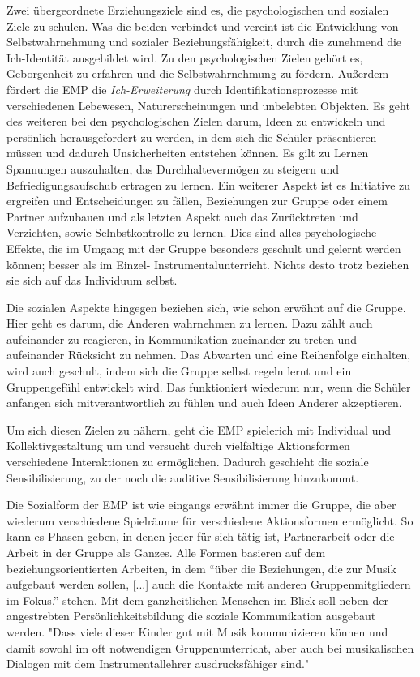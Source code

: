 Zwei übergeordnete Erziehungsziele sind es, die psychologischen und sozialen
Ziele zu schulen. Was die beiden verbindet und vereint ist die Entwicklung
von Selbstwahrnehmung und sozialer Beziehungsfähigkeit, durch die zunehmend die
Ich-Identität ausgebildet wird. Zu den psychologischen Zielen gehört es,
Geborgenheit zu erfahren und die Selbstwahrnehmung zu fördern. Außerdem fördert
die EMP die \emph{Ich-Erweiterung} durch Identifikationsprozesse mit verschiedenen
Lebewesen, Naturerscheinungen und unbelebten Objekten. Es geht des weiteren bei
den psychologischen Zielen darum, Ideen zu entwickeln und persönlich
herausgefordert zu werden, in dem sich die Schüler präsentieren müssen und
dadurch Unsicherheiten entstehen können. Es gilt zu Lernen Spannungen
auszuhalten, das Durchhaltevermögen zu steigern und Befriedigungsaufschub
ertragen zu lernen. Ein weiterer Aspekt ist es Initiative zu ergreifen und
Entscheidungen zu fällen, Beziehungen zur Gruppe oder einem Partner aufzubauen
und als letzten Aspekt auch das Zurücktreten und Verzichten, sowie
Selnbstkontrolle zu lernen. Dies sind alles psychologische Effekte, die im
Umgang mit der Gruppe besonders geschult und gelernt werden können; besser als
im Einzel- Instrumentalunterricht. Nichts desto trotz beziehen sie sich auf das
Individuum selbst.

Die sozialen Aspekte hingegen beziehen sich, wie schon erwähnt auf die Gruppe.
Hier geht es darum, die Anderen wahrnehmen zu lernen. Dazu zählt auch
aufeinander zu reagieren, in Kommunikation zueinander zu treten und aufeinander
Rücksicht zu nehmen. Das Abwarten und eine Reihenfolge einhalten, wird auch
geschult, indem sich die Gruppe selbst regeln lernt und ein Gruppengefühl
entwickelt wird. Das funktioniert wiederum nur, wenn die Schüler anfangen sich
mitverantwortlich zu fühlen und auch Ideen Anderer akzeptieren.

Um sich diesen Zielen zu nähern, geht die EMP spielerich mit Individual und
Kollektivgestaltung um und versucht durch vielfältige Aktionsformen verschiedene
Interaktionen zu ermöglichen. Dadurch geschieht die soziale Sensibilisierung, zu
der noch die auditive Sensibilisierung hinzukommt. 

Die Sozialform der EMP ist wie eingangs erwähnt immer die Gruppe, die aber
wiederum verschiedene Spielräume für verschiedene Aktionsformen ermöglicht. So
kann es Phasen geben, in denen jeder für sich tätig ist, Partnerarbeit oder die
Arbeit in der Gruppe als Ganzes. Alle Formen basieren auf dem
beziehungsorientierten Arbeiten, in dem \enquote{über die Beziehungen, die zur Musik
aufgebaut werden sollen, [...] auch die Kontakte mit anderen Gruppenmitgliedern
im Fokus.} \autocite[10]{dartsch:kern_des_musizierens} stehen. Mit dem
ganzheitlichen Menschen im Blick soll neben der angestrebten
Persönlichkeitsbildung die soziale Kommunikation ausgebaut werden. "Dass viele
dieser Kinder gut mit Musik kommunizieren können und damit sowohl im oft
notwendigen Gruppenunterricht, aber auch bei musikalischen Dialogen mit dem
Instrumentallehrer ausdrucksfähiger sind." %





